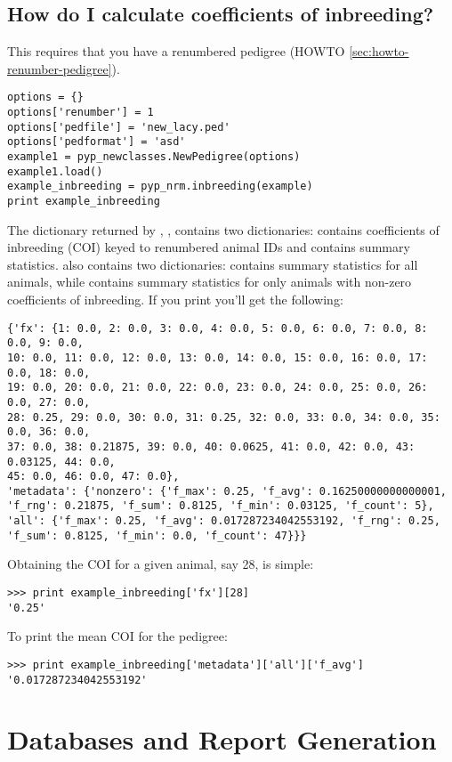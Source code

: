 \subsection{How do I calculate coefficients of inbreeding?}
\label{sec:howto-calculate-inbreeding}
This requires that you have a renumbered pedigree (HOWTO \ref{sec:howto-renumber-pedigree}).
\begin{verbatim}
options = {}
options['renumber'] = 1
options['pedfile'] = 'new_lacy.ped'
options['pedformat'] = 'asd'
example1 = pyp_newclasses.NewPedigree(options)
example1.load()
example_inbreeding = pyp_nrm.inbreeding(example)
print example_inbreeding
\end{verbatim}
The dictionary returned by , , contains two dictionaries:  contains coefficients of inbreeding (COI) keyed to renumbered animal IDs and  contains summary statistics.   also contains two dictionaries:  contains summary statistics for all animals, while  contains summary statistics for only animals with non-zero coefficients of inbreeding.  If you print  you'll get the following:
\begin{verbatim}
{'fx': {1: 0.0, 2: 0.0, 3: 0.0, 4: 0.0, 5: 0.0, 6: 0.0, 7: 0.0, 8: 0.0, 9: 0.0,
10: 0.0, 11: 0.0, 12: 0.0, 13: 0.0, 14: 0.0, 15: 0.0, 16: 0.0, 17: 0.0, 18: 0.0,
19: 0.0, 20: 0.0, 21: 0.0, 22: 0.0, 23: 0.0, 24: 0.0, 25: 0.0, 26: 0.0, 27: 0.0,
28: 0.25, 29: 0.0, 30: 0.0, 31: 0.25, 32: 0.0, 33: 0.0, 34: 0.0, 35: 0.0, 36: 0.0,
37: 0.0, 38: 0.21875, 39: 0.0, 40: 0.0625, 41: 0.0, 42: 0.0, 43: 0.03125, 44: 0.0,
45: 0.0, 46: 0.0, 47: 0.0},
'metadata': {'nonzero': {'f_max': 0.25, 'f_avg': 0.16250000000000001,
'f_rng': 0.21875, 'f_sum': 0.8125, 'f_min': 0.03125, 'f_count': 5},
'all': {'f_max': 0.25, 'f_avg': 0.017287234042553192, 'f_rng': 0.25,
'f_sum': 0.8125, 'f_min': 0.0, 'f_count': 47}}}
\end{verbatim}
Obtaining the COI for a given animal, say 28, is simple:
\begin{verbatim}
>>> print example_inbreeding['fx'][28]
'0.25'
\end{verbatim}
To print the mean COI for the pedigree:
\begin{verbatim}
>>> print example_inbreeding['metadata']['all']['f_avg']
'0.017287234042553192'
\end{verbatim}
\section{Databases and Report Generation}
\label{sec:howto-databases-and-reports}
